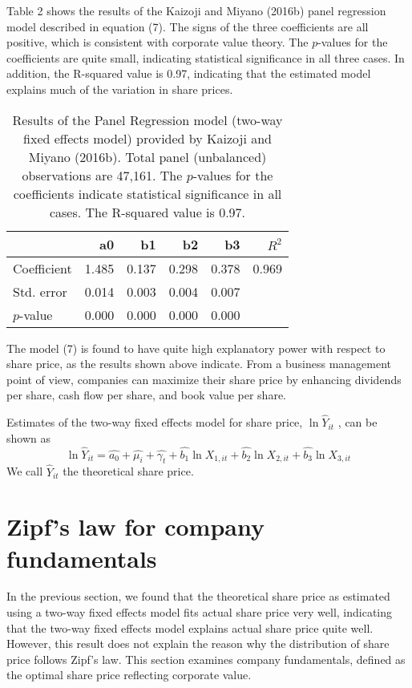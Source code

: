 \documentclass[10pt,a4paper]{article}
\begin{document}
Table 2 shows the results of the Kaizoji and Miyano (2016b) panel regression model described in equation (7). The signs of the three coefficients are all positive, which is consistent with corporate value theory. The $p$-values for the coefficients are quite small, indicating statistical significance in all three cases. In addition, the R-squared value is 0.97, indicating that the estimated model explains much of the variation in share prices.

\begin{table}[H]
\begin{center}
\begin{tabular}{lrrrrr} \hline
   & a0 & b1 & b2 & b3 &$R^{2}$ \\ \hline 
Coefficient&1.485 & 0.137 &0.298 &0.378& 0.969 \\ 
Std. error & 0.014 & 0.003 & 0.004 & 0.007&  \\ 
$p$-value  &  0.000 & 0.000 & 0.000 & 0.000 & \\ \hline
\end{tabular}
\end{center} 
\caption{Results of the Panel Regression model (two-way fixed effects model) provided by Kaizoji and Miyano (2016b). Total panel (unbalanced) observations are 47,161. The $p$-values for the coefficients indicate statistical significance in all cases. The R-squared value is 0.97.}
\end{table}

The model (7) is found to have quite high explanatory power with respect to share price, as the results shown above indicate. From a business management point of view, companies can maximize their share price by enhancing dividends per share, cash flow per share, and book value per share. 

Estimates of the two-way fixed effects model for share price, $\ln \hat{Y}_{it}$  , can be shown as 
\begin{equation}
\ln \hat{Y}_{it} = \hat{a_{0}} + \hat{\mu_{i}} + \hat{\gamma_{t}} + \hat{b_{1}}\ln X_{1,it} + \hat{b_{2}}\ln X_{2,it} + \hat{b_{3} }\ln X_{3,it}
\end{equation} 
We call $\hat{Y}_{it}$  the theoretical share price.
\section{Zipf's law for company fundamentals}

In the previous section, we found that the theoretical share price as estimated using a two-way fixed effects model fits actual share price very well, indicating that the two-way fixed effects model explains actual share price quite well. However, this result does not explain the reason why the distribution of share price follows Zipf's law. This section examines company fundamentals, defined as the optimal share price reflecting corporate value. 
\end{document}
